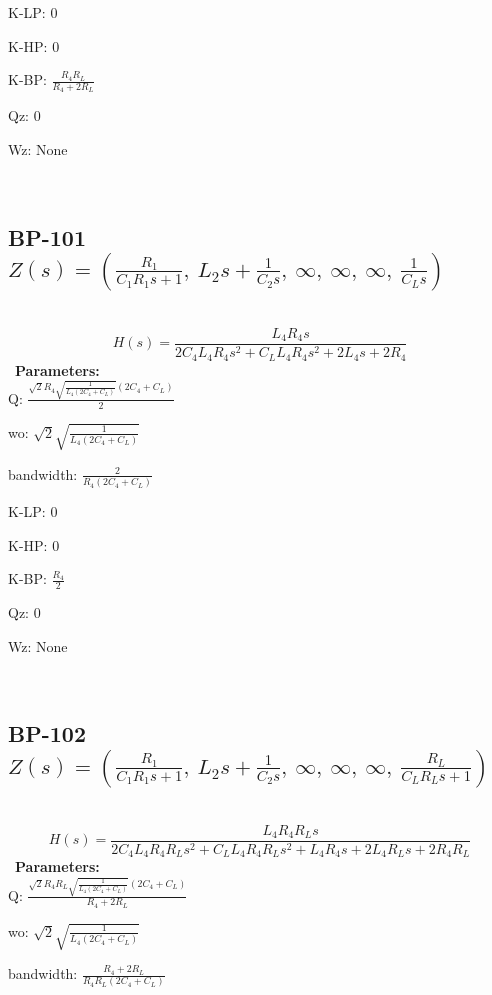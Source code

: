 \documentclass{article}
\begin{document}
K-LP: $0$\ 

K-HP: $0$\ 

K-BP: $\frac{R_{4} R_{L}}{R_{4} + 2 R_{L}}$\ 

Qz: $0$\ 

Wz: $\text{None}$\ 

\ 

\subsection{BP-101 $Z(s) = \left( \frac{R_{1}}{C_{1} R_{1} s + 1}, \  L_{2} s + \frac{1}{C_{2} s}, \  \infty, \  \infty, \  \infty, \  \frac{1}{C_{L} s}\right)$ } \ 
\textbf{\[H(s) = \frac{L_{4} R_{4} s}{2 C_{4} L_{4} R_{4} s^{2} + C_{L} L_{4} R_{4} s^{2} + 2 L_{4} s + 2 R_{4}}\] } \ 
\textbf{Parameters:}\\ 

Q: $\frac{\sqrt{2} R_{4} \sqrt{\frac{1}{L_{4} \left(2 C_{4} + C_{L}\right)}} \left(2 C_{4} + C_{L}\right)}{2}$\ 

wo: $\sqrt{2} \sqrt{\frac{1}{L_{4} \left(2 C_{4} + C_{L}\right)}}$\ 

bandwidth: $\frac{2}{R_{4} \left(2 C_{4} + C_{L}\right)}$\ 

K-LP: $0$\ 

K-HP: $0$\ 

K-BP: $\frac{R_{4}}{2}$\ 

Qz: $0$\ 

Wz: $\text{None}$\ 

\ 

\subsection{BP-102 $Z(s) = \left( \frac{R_{1}}{C_{1} R_{1} s + 1}, \  L_{2} s + \frac{1}{C_{2} s}, \  \infty, \  \infty, \  \infty, \  \frac{R_{L}}{C_{L} R_{L} s + 1}\right)$ } \ 
\textbf{\[H(s) = \frac{L_{4} R_{4} R_{L} s}{2 C_{4} L_{4} R_{4} R_{L} s^{2} + C_{L} L_{4} R_{4} R_{L} s^{2} + L_{4} R_{4} s + 2 L_{4} R_{L} s + 2 R_{4} R_{L}}\] } \ 
\textbf{Parameters:}\\ 

Q: $\frac{\sqrt{2} R_{4} R_{L} \sqrt{\frac{1}{L_{4} \left(2 C_{4} + C_{L}\right)}} \left(2 C_{4} + C_{L}\right)}{R_{4} + 2 R_{L}}$\ 

wo: $\sqrt{2} \sqrt{\frac{1}{L_{4} \left(2 C_{4} + C_{L}\right)}}$\ 

bandwidth: $\frac{R_{4} + 2 R_{L}}{R_{4} R_{L} \left(2 C_{4} + C_{L}\right)}$\ 
\end{document}

